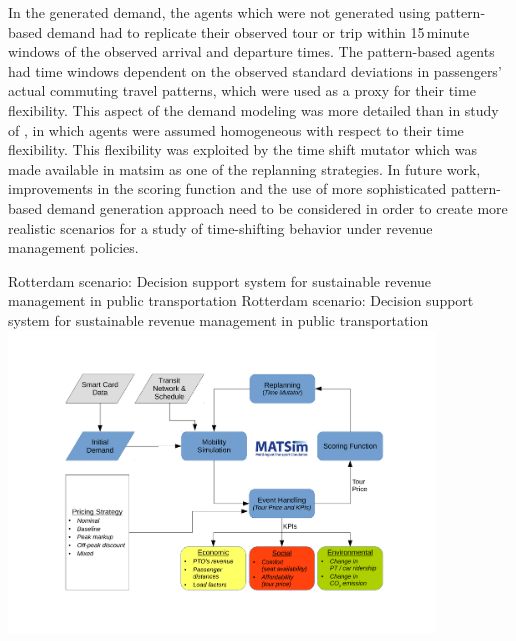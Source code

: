 In the generated demand, the agents which were not generated using pattern-based demand had to replicate their observed tour or trip within 15\,minute windows of the observed arrival and departure times. The pattern-based agents had time windows dependent on the observed standard deviations in passengers' actual commuting travel patterns, which were used as a proxy for their time flexibility. This aspect of the demand modeling was more detailed than in study of \citet[][]{LovricEtAl_DSS_2013}, in which agents were assumed homogeneous with respect to their time flexibility. This flexibility was exploited by the time shift mutator which was made available in \gls{matsim} as one of the \gls{replanning} strategies. In future work, improvements in the scoring function and the use of more sophisticated pattern-based demand generation approach need to be considered in order to create more realistic scenarios for a study of time-shifting behavior under revenue management policies.

\createfigure%
{Rotterdam scenario: Decision support system for sustainable revenue management in public transportation}%
{Rotterdam scenario: Decision support system for sustainable revenue management in public transportation}%
{\label{fig:rotterdam}}%
{\includegraphics[width=0.85\textwidth, angle=0]{./using/figures/rotterdam}}%
{}


